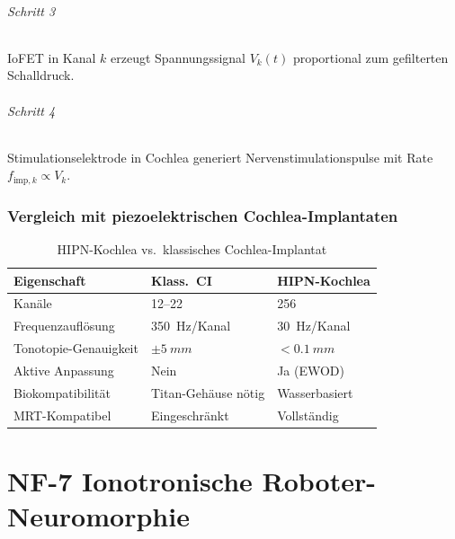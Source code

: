 ﻿\documentclass[a4paper,12pt]{scrreprt}
\theoremstyle{definition}
\begin{document}
\paragraph{Schritt 3} IoFET in Kanal $k$ erzeugt Spannungssignal
$V_k(t)$ proportional zum gefilterten Schalldruck.

\paragraph{Schritt 4} Stimulationselektrode in Cochlea generiert
Nervenstimulationspulse mit Rate $f_{\mathrm{imp},k} \propto V_k$.

\section{Vergleich mit piezoelektrischen Cochlea-Implantaten}

\begin{table}[H]
\caption{HIPN-Kochlea vs.\ klassisches Cochlea-Implantat}
\label{tab:nf6_impl}
\begin{tabular}{lll}
\toprule
\textbf{Eigenschaft}       & \textbf{Klass.\ CI}     & \textbf{HIPN-Kochlea} \\
\midrule
Kanäle                    & 12--22                   & 256 \\
Frequenzauflösung         & \SI{350}{Hz/Kanal}       & \SI{30}{Hz/Kanal} \\
Tonotopie-Genauigkeit     & $\pm\SI{5}{mm}$          & $<\SI{0.1}{mm}$ \\
Aktive Anpassung          & Nein                     & Ja (EWOD) \\
Biokompatibilität         & Titan-Gehäuse nötig      & Wasserbasiert \\
MRT-Kompatibel            & Eingeschränkt            & Vollständig \\
\bottomrule
\end{tabular}
\end{table}

\part{NF-7 \quad Ionotronische Roboter-Neuromorphie}
\label{part:nf7}
\end{document}
